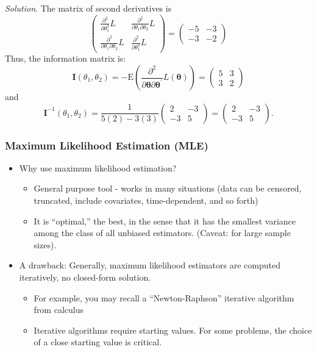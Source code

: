 \documentclass[]{book}
\begin{document}
\emph{Solution}. The matrix of second derivatives is \[\left(
\begin{array}{cc}
  \frac{ \partial ^2}{\partial \theta_1 ^2 } L & \frac{ \partial ^2}{\partial \theta_1 \partial \theta_2 } L  \\
  \frac{ \partial ^2}{\partial \theta_1 \partial \theta_2 } L & \frac{ \partial ^2}{\partial \theta_1 ^2 } L
\end{array} \right) =
\left(
\begin{array}{cc}
  -5 & -3  \\
  -3 & -2
\end{array} \right)\] Thus, the information matrix is:
\[\mathbf{I}(\theta_1, \theta_2) = -\mathrm{E} \left( \frac{ \partial^2}{\partial \boldsymbol \theta
\partial \boldsymbol \theta^{\prime}} L(\boldsymbol \theta) \right) = \left(
\begin{array}{cc}
  5 & 3  \\
  3 & 2
\end{array} \right)\] and
\[\mathbf{I}^{-1}(\theta_1, \theta_2) = \frac{1}{5(2) - 3(3)}\left(
\begin{array}{cc}
  2 & -3  \\
  -3 & 5
\end{array} \right) = \left(
\begin{array}{cc}
  2 & -3  \\
  -3 & 5
\end{array} \right) .\]

\subsubsection{Maximum Likelihood Estimation
(MLE)}\label{maximum-likelihood-estimation-mle}

\begin{itemize}
\item
  Why use maximum likelihood estimation?

  \begin{itemize}
  \item
    General purpose tool - works in many situations (data can be
    censored, truncated, include covariates, time-dependent, and so
    forth)
  \item
    It is ``optimal,'' the best, in the sense that it has the smallest
    variance among the class of all unbiased estimators. (Caveat: for
    large sample sizes).
  \end{itemize}
\item
  A drawback: Generally, maximum likelihood estimators are computed
  iteratively, no closed-form solution.

  \begin{itemize}
  \item
    For example, you may recall a ``Newton-Raphson'' iterative algorithm
    from calculus
  \item
    Iterative algorithms require starting values. For some problems, the
    choice of a close starting value is critical.
  \end{itemize}
\end{itemize}
\end{document}
